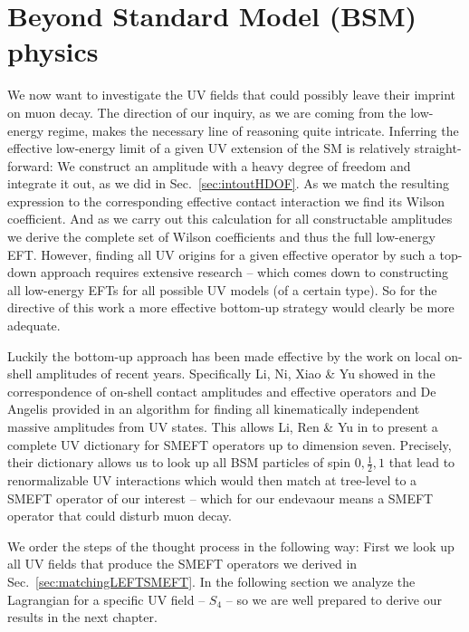\chapter{Beyond Standard Model (BSM) physics}
We now want to investigate the UV fields that could possibly leave their imprint on muon decay. The direction of our inquiry, as we are coming from the low-energy regime, makes the necessary line of reasoning quite intricate. Inferring the effective low-energy limit of a given UV extension of the SM is relatively straight-forward: We construct an amplitude with a heavy degree of freedom and integrate it out, as we did in Sec.~\ref{sec:intoutHDOF}. As we match the resulting expression to the corresponding effective contact interaction we find its Wilson coefficient. And as we carry out this calculation for all constructable amplitudes we derive the complete set of Wilson coefficients and thus the full low-energy EFT. However, finding all UV origins for a given effective operator by such a top-down approach requires extensive research -- which comes down to constructing all low-energy EFTs for all possible UV models (of a certain type). So for the directive of this work a more effective bottom-up strategy would clearly be more adequate.\par 
Luckily the bottom-up approach has been made effective by the work on local on-shell amplitudes of recent years. Specifically Li, Ni, Xiao \& Yu showed in \cite{li2022bottom} the correspondence of on-shell contact amplitudes and effective operators and De Angelis provided in \cite{de2022amplitude} an algorithm for finding all kinematically independent massive amplitudes from UV states. This allows Li, Ren \& Yu in \cite{li2024complete} to present a complete UV dictionary for SMEFT operators up to dimension seven. Precisely, their dictionary allows us to look up all BSM particles of spin $0,\tfrac{1}{2},1$ that lead to renormalizable UV interactions which would then match at tree-level to a SMEFT operator of our interest -- which for our endevaour means a SMEFT operator that could disturb muon decay.\par 
We order the steps of the thought process in the following way: First we look up all UV fields that produce the SMEFT operators we derived in Sec.~\ref{sec:matchingLEFTSMEFT}. In the following section we analyze the Lagrangian for a specific UV field -- $S_4$ -- so we are well prepared to derive our results in the next chapter.

